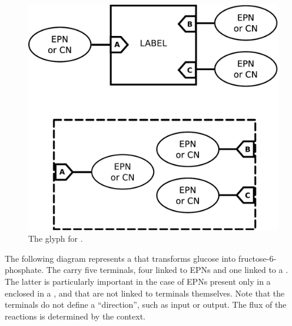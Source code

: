 \begin{figure}[H]
  \centering
  \includegraphics[scale = 0.3]{images/submap}
  \caption{The \PD glyph for .}
  \label{fig:submap}
\end{figure}


The following diagram represents a  that transforms glucose into fructose-6-phosphate. The  carry five terminals, four linked to EPNs and one linked to a . The latter is particularly important in the case of EPNs present only in a  enclosed in a , and that are not linked to terminals themselves. Note that the terminals do not define a ``direction'', such as input or output. The flux of the reactions is determined by the context.

\begin{center}
\end{center}

